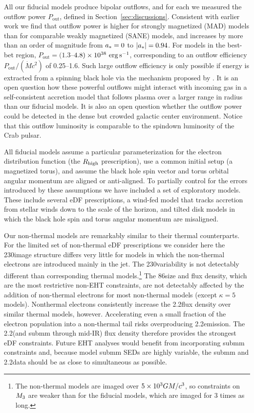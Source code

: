 All our fiducial models produce bipolar outflows, and for each we measured the outflow power $P_\mathrm{out}$, defined in Section~\ref{sec:discussions}.
Consistent with earlier work we find that outflow power is higher for strongly magnetized (MAD) models than for comparable weakly magnetized (SANE) models, and increases by more than an order of magnitude from $a_* = 0$ to $|a_*| = 0.94$.
For models in the best-bet region, $P_\mathrm{out} = (1.3$--$4.8) \times 10^{38}\,\,\mathrm{erg}\,\mathrm{s}^{-1}$, corresponding to an outflow efficiency $P_\mathrm{out} /(\dot{M} c^2)$ of 0.25--1.6.
Such large outflow efficiency is only possible if energy is extracted from a spinning black hole via the mechanism proposed by  \cite{1977MNRAS.179..433B}.
It is an open question how these powerful outflows might interact with incoming gas in a self-consistent accretion model that follows plasma over a larger range in radius than our fiducial models.
It is also an open question whether the outflow power could be detected in the dense but crowded galactic center environment.
Notice that this outflow luminosity is comparable to the spindown luminosity of the Crab pulsar.

All fiducial models assume a particular parameterization for the electron distribution function (the $R_\mathrm{high}$ prescription), use a common initial setup (a magnetized torus), and assume the black hole spin vector and torus orbital angular momentum are aligned or anti-aligned.
To partially control for the errors introduced by these assumptions we have included a set of exploratory models.  These include several eDF prescriptions, a wind-fed model that tracks accretion from stellar winds down to the scale of the horizon, and tilted disk models in which the black hole spin and torus angular momentum are misaligned.

Our non-thermal models are remarkably similar to their thermal counterparts.
For the limited set of non-thermal eDF prescriptions we consider here the 230\GHz image structure differs very little for models in which the non-thermal electrons are introduced mainly in the jet.  The 230\GHz variability is not detectably different than corresponding thermal models.\footnote{The non-thermal models are imaged over $5\times 10^3GM/c^3$, so constraints on $M_{3}$ are weaker than for the fiducial models, which are imaged for 3 times as long.}
The 86\GHz size and flux density, which are the most restrictive non-EHT constraints, are not detectably affected by the addition of non-thermal electrons for most non-thermal models (except $\kappa = 5$ models).
Nonthermal electrons consistently increase the 2.2\um flux density over similar thermal models, however.
Accelerating even a small fraction of the electron population into a non-thermal tail risks overproducing 2.2\um emission.
The 2.2\um (and submm through mid-IR) flux density therefore provides the strongest eDF constraints.
Future EHT analyses would benefit from incorporating submm constraints \citep[e.g.,][]{2019ApJ...881L...2B} and, because model submm SEDs are highly variable, the submm and 2.2\um data should be as close to simultaneous as possible.

